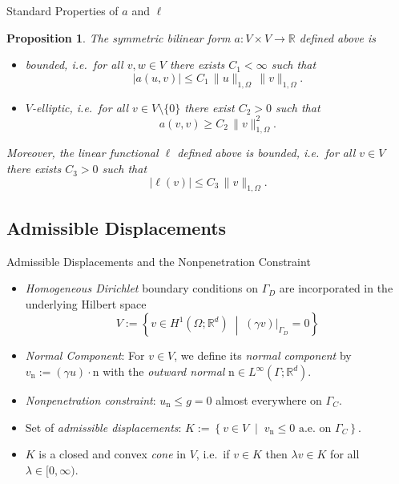 \documentclass[10pt,aspectratio=169]{beamer}
\newtheorem{proposition}{Proposition}[section]
\def\R{{\mathbb R}}
\begin{document}
\begin{frame}{Standard Properties of $a$ and $\ell$}
	\begin{proposition}
		The symmetric bilinear form $a:V\times V\to \R$ defined above is
		\begin{itemize}
			\item[i)] {\em bounded}, i.e.\ for all $v,w\in V$ there exists $C_1<\infty$ such that
			      \begin{equation*}
				      |a(u,v)|\le C_1\,\|u\|_{1,\Omega}\,\|v\|_{1,\Omega}.
			      \end{equation*}
			\item[ii)] $V${\em -elliptic}, i.e.\ for all $v\in V\setminus\{0\}$ there exist $C_2>0$ such that
			      \begin{equation*}
				      a(v,v)\ge C_2\,\|v\|_{1,\Omega}^2.
			      \end{equation*}
		\end{itemize}
		Moreover, the linear functional $\ell$ defined above is {\em bounded}, i.e.\ for all $v\in V$ there exists $C_3>0$ such that
		\begin{equation*}
			|\ell (v)|\le C_3\,\|v\|_{1,\Omega}.
		\end{equation*}
	\end{proposition}
\end{frame}

\subsection{Admissible Displacements}

\begin{frame}{Admissible Displacements and the Nonpenetration Constraint}
	\begin{itemize}
		\item {\em Homogeneous Dirichlet} boundary conditions on $\Gamma_D$ are incorporated in the underlying Hilbert space
		      \begin{equation*}
			      V:=\left\{ v\in H^1(\Omega;\R^d)\;\middle|\; (\gamma v)|_{\Gamma_D}=0\right\}
		      \end{equation*}
		\item {\em Normal Component}: For $v\in V$, we define its {\em normal component} by $v_\mathrm{n}:= (\gamma u)\cdot \mathrm{n}$ with the {\em outward normal} $\mathrm{n}\in L^\infty(\Gamma;\R^d)$.
		\item {\em Nonpenetration constraint}: $u_\mathrm{n}\le g = 0$ almost everywhere on $\Gamma_C$.
		\item Set of {\em admissible displacements}: $K := \left\{ v\in V\;\middle|\; v_{\mathrm n}\le 0 \text{ a.e.\ on }\Gamma_C\right\}$.
		\item $K$ is a closed and convex {\em cone} in $V$, i.e.\ if $v\in K$ then $\lambda v\in K$ for all $\lambda\in [0,\infty)$.
	\end{itemize}
	\begin{figure}[!h]
		\centering
		
	\end{figure}
\end{frame}
\end{document}
